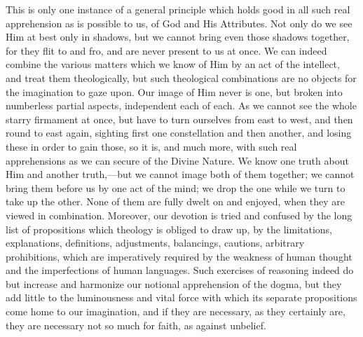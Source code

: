 This is only one instance of a general principle which holds good
in all such real apprehension as is possible to us, of God and His
Attributes. Not only do we see Him at best only in shadows, but we
cannot bring even those shadows together, for they flit to and fro,
and are never present to us at once. We can indeed combine the various
matters which we know of Him by an act of the intellect, and treat
them theologically, but such theological combinations are no objects
for the imagination to gaze upon. Our image of Him never is one, but
broken into numberless partial aspects, independent each of each. As
we cannot see the whole starry firmament at once, but have to turn
ourselves from east to west, and then round to east again, sighting
first one constellation and then another, and losing these in order to
gain those, so it is, and much more, with such real apprehensions as
we can secure of the Divine Nature. We know one truth about Him and
another truth,—but we cannot image both of them together; we cannot
bring them before us by one act of the mind; we drop the one while we
turn to take up the other. None of them are fully dwelt on and
enjoyed, when they are viewed in combination. Moreover, our devotion
is tried and confused by the long list of propositions which theology
is obliged to draw up, by the limitations, explanations,
definitions, adjustments, balancings, cautions, arbitrary
prohibitions, which are imperatively required by the weakness of human
thought and the imperfections of human languages. Such exercises of
reasoning indeed do but increase and harmonize our notional
apprehension of the dogma, but they add little to the luminousness and
vital force with which its separate propositions come home to our
imagination, and if they are necessary, as they certainly are, they
are necessary not so much for faith, as against unbelief.

